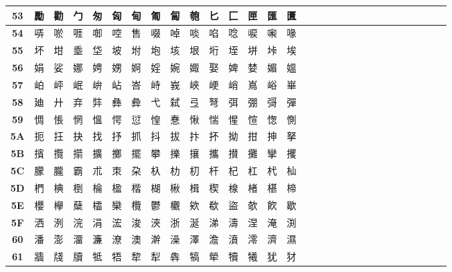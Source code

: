 \begin{table}[H]
\begin{tabular}{|Sc|Sc|Sc|Sc|Sc|Sc|Sc|Sc|Sc|Sc|Sc|Sc|Sc|Sc|Sc|}
\textbf{53} & 勵 & 勸 & 勹 & 匆 & 匈 & 甸 & 匍 & 匐 & 匏 & 匕 & 匚 & 匣 & 匯 & 匱 \\ \hline
\textbf{54} & 哢 & 唹 & 啀 & 啣 & 啌 & 售 & 啜 & 啅 & 啖 & 啗 & 唸 & 唳 & 啝 & 喙 \\ \hline
\textbf{55} & 坏 & 坩 & 埀 & 垈 & 坡 & 坿 & 垉 & 垓 & 垠 & 垳 & 垤 & 垪 & 垰 & 埃 \\ \hline
\textbf{56} & 娟 & 娑 & 娜 & 娉 & 娚 & 婀 & 婬 & 婉 & 娵 & 娶 & 婢 & 婪 & 媚 & 媼 \\ \hline
\textbf{57} & 岶 & 岼 & 岷 & 峅 & 岾 & 峇 & 峙 & 峩 & 峽 & 峺 & 峭 & 嶌 & 峪 & 崋 \\ \hline
\textbf{58} & 廸 & 廾 & 弃 & 弉 & 彝 & 彜 & 弋 & 弑 & 弖 & 弩 & 弭 & 弸 & 彁 & 彈 \\ \hline
\textbf{59} & 惆 & 悵 & 惘 & 慍 & 愕 & 愆 & 惶 & 惷 & 愀 & 惴 & 惺 & 愃 & 愡 & 惻 \\ \hline
\textbf{5A} & 扼 & 抂 & 抉 & 找 & 抒 & 抓 & 抖 & 拔 & 抃 & 抔 & 拗 & 拑 & 抻 & 拏 \\ \hline
\textbf{5B} & 擯 & 攬 & 擶 & 擴 & 擲 & 擺 & 攀 & 擽 & 攘 & 攜 & 攅 & 攤 & 攣 & 攫 \\ \hline
\textbf{5C} & 朦 & 朧 & 霸 & 朮 & 朿 & 朶 & 杁 & 朸 & 朷 & 杆 & 杞 & 杠 & 杙 & 杣 \\ \hline
\textbf{5D} & 椚 & 椣 & 椡 & 棆 & 楹 & 楷 & 楜 & 楸 & 楫 & 楔 & 楾 & 楮 & 椹 & 楴 \\ \hline
\textbf{5E} & 櫻 & 欅 & 蘖 & 櫺 & 欒 & 欖 & 鬱 & 欟 & 欸 & 欷 & 盜 & 欹 & 飮 & 歇 \\ \hline
\textbf{5F} & 洒 & 洌 & 浣 & 涓 & 浤 & 浚 & 浹 & 浙 & 涎 & 涕 & 濤 & 涅 & 淹 & 渕 \\ \hline
\textbf{60} & 潘 & 澎 & 澑 & 濂 & 潦 & 澳 & 澣 & 澡 & 澤 & 澹 & 濆 & 澪 & 濟 & 濕 \\ \hline
\textbf{61} & 牆 & 牋 & 牘 & 牴 & 牾 & 犂 & 犁 & 犇 & 犒 & 犖 & 犢 & 犧 & 犹 & 犲 \\ \hline
\end{tabular}
\end{table}

